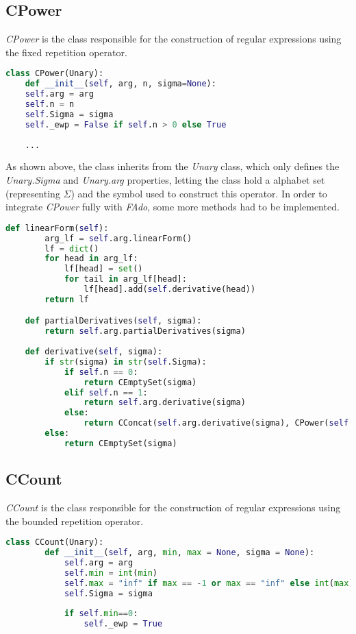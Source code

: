 \subsection{CPower}
\textit{CPower} is the class responsible for the construction of regular expressions using the fixed repetition operator.

\begin{lstlisting}[language=Python]
class CPower(Unary):
	def __init__(self, arg, n, sigma=None):
	self.arg = arg
	self.n = n
	self.Sigma = sigma
	self._ewp = False if self.n > 0 else True
	
	...
\end{lstlisting}

As shown above, the class inherits from the \textit{Unary} class, which only defines the \textit{Unary.Sigma} and \textit{Unary.arg} properties, letting the class hold a alphabet set (representing $\Sigma$) and the symbol used to construct this operator.
In order to integrate \textit{CPower} fully with \textit{FAdo}, some more methods had to be implemented.

\begin{lstlisting}[language=Python]
	def linearForm(self):
		arg_lf = self.arg.linearForm()
		lf = dict()
		for head in arg_lf:
			lf[head] = set()
			for tail in arg_lf[head]:
				lf[head].add(self.derivative(head))
		return lf

	def partialDerivatives(self, sigma):
		return self.arg.partialDerivatives(sigma)
	
	def derivative(self, sigma):
		if str(sigma) in str(self.Sigma):
			if self.n == 0:
				return CEmptySet(sigma)
			elif self.n == 1:
				return self.arg.derivative(sigma)
			else:
				return CConcat(self.arg.derivative(sigma), CPower(self.arg, self.n-1, self.Sigma))
		else:
			return CEmptySet(sigma)
\end{lstlisting}

\subsection{CCount}
\textit{CCount} is the class responsible for the construction of regular expressions using the bounded repetition operator.


\begin{lstlisting}[language=Python]
	class CCount(Unary):
		def __init__(self, arg, min, max = None, sigma = None):
			self.arg = arg
			self.min = int(min)
			self.max = "inf" if max == -1 or max == "inf" else int(max)-1
			self.Sigma = sigma
	
			if self.min==0:
				self._ewp = True
\end{lstlisting}

